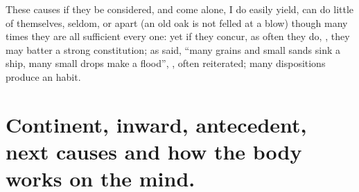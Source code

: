 
These causes if they be considered, and come alone, I do easily yield, can do
little of themselves, seldom, or apart (an old oak is not felled at a blow)
though many times they are all sufficient every one: yet if they concur, as
often they do, , they may batter a strong constitution; as \Austin{}
said, \enquote{many grains and small sands sink a ship, many small drops make a flood},
\etc{}, often reiterated; many dispositions produce an habit.

\section{Continent, inward, antecedent, next causes and how the body works on
the mind.}

